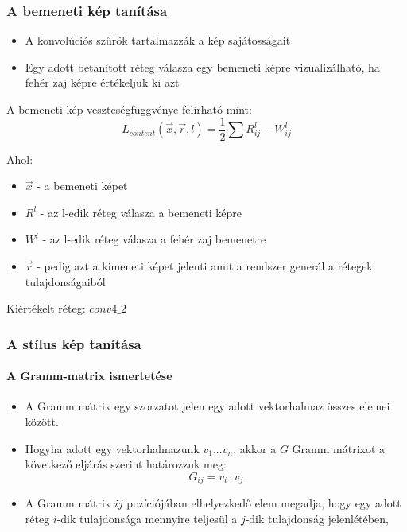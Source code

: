 \documentclass{beamer}
\begin{document}
	\begin{frame}
		\frametitle{A bemeneti kép tanítása}
		\begin{itemize}
			\item A konvolúciós szűrök tartalmazzák a kép sajátosságait
			\item Egy adott betanított réteg válasza egy bemeneti képre vizualizálható, ha fehér zaj képre értékeljük ki azt
		\end{itemize}
			
		A bemeneti kép veszteségfüggvénye felírható mint:
		\begin{equation}
			L_{content}(\vec{x}, \vec{r}, l) = \frac{1}{2}\sum{R^l_{ij} - W^l_{ij}}
		\end{equation}
		
		Ahol:
		\begin{itemize}
			\item \(\vec{x}\) - a bemeneti képet
			\item \(R^l\) - az l-edik réteg válasza a bemeneti képre
			\item \(W^l\) - az l-edik réteg válasza a fehér zaj bemenetre
			\item \(\vec{r}\) - pedig azt a kimeneti képet jelenti amit a rendszer generál a rétegek tulajdonságaiból
		\end{itemize}
		
		Kiértékelt réteg: \(conv4\_2\)
	
	\end{frame}

	\begin{frame}
		\frametitle{A stílus kép tanítása}
		\framesubtitle{A Gramm-matrix ismertetése}
		
		\begin{itemize}
			\item A Gramm mátrix egy szorzatot jelen egy adott vektorhalmaz összes elemei között.
			\item Hogyha adott egy vektorhalmazunk \(v_1...v_n\), akkor a \(G\) Gramm mátrixot a következő eljárás szerint határozzuk meg:
				\begin{equation}
					G_{ij} = v_i \cdot v_j
				\end{equation}
			\item A Gramm mátrix \(ij\) pozíciójában elhelyezkedő elem megadja, hogy egy adott réteg \(i\)-dik tulajdonsága mennyire teljesül a \(j\)-dik tulajdonság jelenlétében,
		\end{itemize}
	\end{frame}
\end{document}
